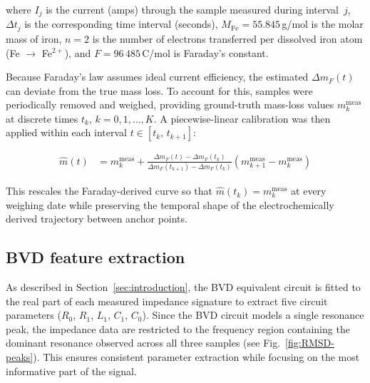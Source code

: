 \documentclass[journal,twoside,web]{ieeecolor}
\begin{document}
where $I_j$ is the current (amps) through the sample measured during interval~$j$, $\Delta t_j$ is the corresponding time interval (seconds), $M_{\mathrm{Fe}} = 55.845$\,g/mol is the molar mass of iron, $n = 2$ is the number of electrons transferred per dissolved iron atom (Fe $\rightarrow$ Fe$^{2+}$), and $F = 96\,485$\,C/mol is Faraday's constant.

Because Faraday's law assumes ideal current efficiency, the estimated $\Delta m_F(t)$ can deviate from the true mass loss. To account for this, samples were periodically removed and weighed, providing ground-truth mass-loss values $m_k^{\mathrm{meas}}$ at discrete times $t_k$, $k = 0, 1, \dots, K$. A piecewise-linear calibration was then applied within each interval $t \in [t_k,\, t_{k+1}]$:

\begin{equation}
    \begin{split}
    \hat{m}(t) &= m_k^{\mathrm{meas}}
      + \frac{\Delta m_F(t) - \Delta m_F(t_k)}
             {\Delta m_F(t_{k+1}) - \Delta m_F(t_k)}
        \left( m_{k+1}^{\mathrm{meas}} - m_k^{\mathrm{meas}} \right)
    \end{split}
    \label{eq:piecewise_cal}
\end{equation}

This rescales the Faraday-derived curve so that $\hat{m}(t_k) = m_k^{\mathrm{meas}}$ at every weighing date while preserving the temporal shape of the electrochemically derived trajectory between anchor points. 




\subsection{BVD feature extraction}\label{sec:feature-engineering}

As described in Section~\ref{sec:introduction}, the BVD equivalent circuit is fitted to the real part of each measured impedance signature to extract five circuit parameters ($R_0$, $R_1$, $L_1$, $C_1$, $C_0$). Since the BVD circuit models a single resonance peak, the impedance data are restricted to the frequency region containing the dominant resonance observed across all three samples (see Fig.~\ref{fig:RMSD-peaks}). This ensures consistent parameter extraction while focusing on the most informative part of the signal.
\end{document}
